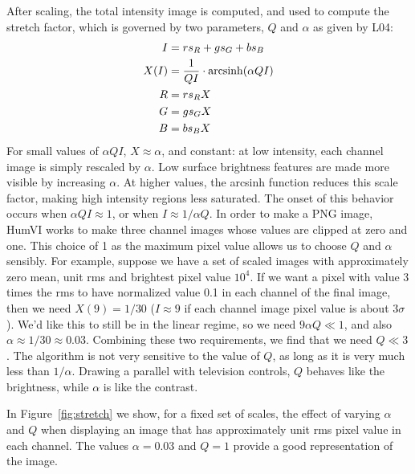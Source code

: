 \documentclass[letterpaper, 11pt]{article}
\def\humvi{{\sc HumVI}\xspace}
\begin{document}
After scaling, the total intensity image is
computed, and used to compute the stretch factor, which is governed by two
parameters, $Q$ and $\alpha$ as given by L04:
\begin{align}
I &= r s_R + g s_G + b s_B \\
X(I) &= \frac{1}{QI}\cdot{\rm arcsinh}(\alpha Q I) \\
R &= r s_R X \\
G &= g s_G X \\
B &= b s_B X \\
\end{align}
For small values of $\alpha Q I$, $X \approx \alpha$, and constant: at low
intensity, each channel image is simply rescaled by $\alpha$. Low surface
brightness features are made more visible by increasing $\alpha$. 
At higher values, 
the arcsinh function reduces this scale factor, making high intensity regions
less saturated. The onset of this behavior occurs when $\alpha Q I \approx 1$,
or when $I \approx 1 / \alpha Q$. 
In order to make a PNG image, \humvi works to make three channel images whose
values are clipped at zero and one. This choice of 1 as the maximum pixel
value allows us to choose $Q$ and $\alpha$ sensibly. For example, suppose we
have a set of scaled images with approximately zero mean, unit 
rms and brightest pixel
value $10^4$. If we want a pixel with value 3 times the rms to have
normalized value 0.1 in each channel of 
the final image, then we need $X(9)=1/30$ ($I\approx9$ if each channel image
pixel value is about $3\sigma$). We'd
like this to still be in the linear regime, so we need $9 \alpha Q \ll 1$,
and also $\alpha \approx 1/30 \approx 0.03$. Combining these two requirements,
we find that we need $Q
\ll 3$. The algorithm is not very sensitive to the value of $Q$, as long as
it is very much less than $1/\alpha$. 
Drawing a parallel with television controls,
$Q$ behaves like the brightness, while $\alpha$ is like the contrast.

In Figure~\ref{fig:stretch} we show, for a fixed set of scales, the effect of
varying $\alpha$ and $Q$ when displaying an image that has approximately unit
rms pixel value in each channel. The values $\alpha = 0.03$ and $Q = 1$
provide a good representation of the image. 
\end{document}
